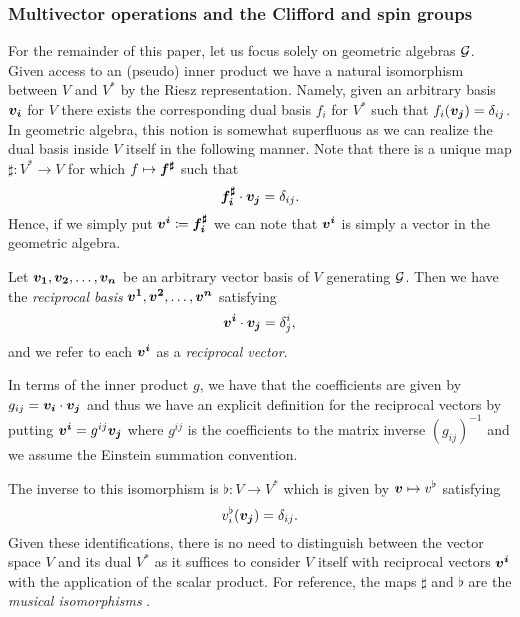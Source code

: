 \subsubsection{Multivector operations and the Clifford and spin groups}
\label{subsubsec:reverse_inverse_clifford_spin_groups}
For the remainder of this paper, let us focus solely on geometric algebras $\mathcal{G}$. Given access to an (pseudo) inner product we have a natural isomorphism between $V$ and $V^*$ by the Riesz representation.  Namely, given an arbitrary basis $\boldsymbol{v_i}$ for $V$ there exists the corresponding dual basis $f_i$ for $V^*$ such that $f_i(\boldsymbol{v_j})=\delta_{ij}$. In geometric algebra, this notion is somewhat superfluous as we can realize the dual basis inside $V$ itself in the following manner. Note that there is a unique map $\sharp \colon V^* \to V$ for which $f\mapsto \boldsymbol{f^\sharp}$ such that
\begin{equation}
\boldsymbol{f_i^\sharp} \cdot \boldsymbol{v_j} = \delta_{ij}.
\end{equation}
Hence, if we simply put $\boldsymbol{v^i} \coloneqq \boldsymbol{f_i^\sharp}$ we can note that $\boldsymbol{v^i}$ is simply a vector in the geometric algebra.
\begin{definition}
Let $\boldsymbol{v_1},\boldsymbol{v_2},\dots,\boldsymbol{v_n}$ be an arbitrary vector basis of $V$ generating $\mathcal{G}$. Then we have the \emph{reciprocal basis} $\boldsymbol{v^1},\boldsymbol{v^2},\dots,\boldsymbol{v^n}$ satisfying
\begin{equation}
    \boldsymbol{v^i}\cdot \boldsymbol{v_j} = \delta^i_j,
\end{equation}
and we refer to each $\boldsymbol{v^i}$ as a \emph{reciprocal vector}.
\end{definition}
In terms of the inner product $g$, we have that the coefficients are given by $g_{ij}=\boldsymbol{v_i}\cdot \boldsymbol{v_j}$ and thus we have an explicit definition for the reciprocal vectors by putting $\boldsymbol{v^i} = g^{ij}\boldsymbol{v_j}$ where $g^{ij}$ is the coefficients to the matrix inverse $(g_{ij})^{-1}$ and we assume the Einstein summation convention. 

The inverse to this isomorphism is $\flat \colon V \to V^*$ which is given by $\boldsymbol{v} \mapsto v^\flat$ satisfying
\[
v_i^\flat (\boldsymbol{v_j})= \delta_{ij}.
\]
Given these identifications, there is no need to distinguish between the vector space $V$ and its dual $V^*$ as it suffices to consider $V$ itself with reciprocal vectors $\boldsymbol{v^i}$ with the application of the scalar product. For reference, the maps $\sharp$ and $\flat$ are the \emph{musical isomorphisms} .

